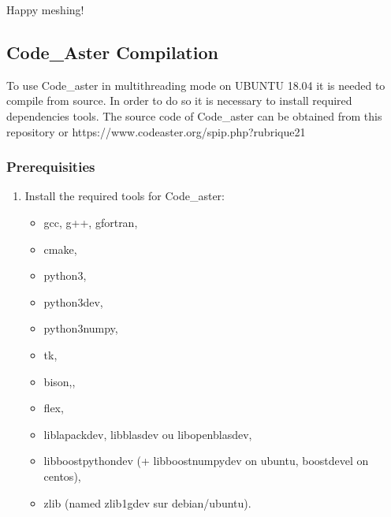\documentclass[letterpaper,10pt,english]{sphinxmanual}
\begin{document}
Happy meshing!


\subsection{Code\_Aster Compilation}
\label{\detokenize{software_setup/code_aster:code-aster-compilation}}\label{\detokenize{software_setup/code_aster::doc}}
To use Code\_aster in multithreading mode on UBUNTU 18.04 it is needed to compile from source. In order to do so it is necessary to install required dependencies tools. The source code of Code\_aster can be obtained from this repository or https://www.code\sphinxhyphen{}aster.org/spip.php?rubrique21


\subsubsection{Prerequisities}
\label{\detokenize{software_setup/code_aster:prerequisities}}\begin{enumerate}
%
\item {} 
Install the required tools for Code\_aster:
\begin{itemize}
\item {} 
gcc, g++, gfortran,

\item {} 
cmake,

\item {} 
python3,

\item {} 
python3\sphinxhyphen{}dev,

\item {} 
python3\sphinxhyphen{}numpy,

\item {} 
tk,

\item {} 
bison,,

\item {} 
flex,

\item {} 
liblapack\sphinxhyphen{}dev, libblas\sphinxhyphen{}dev ou libopenblas\sphinxhyphen{}dev,

\item {} 
libboost\sphinxhyphen{}python\sphinxhyphen{}dev (+ libboost\sphinxhyphen{}numpy\sphinxhyphen{}dev on ubuntu, boost\sphinxhyphen{}devel on centos),

\item {} 
zlib (named zlib1g\sphinxhyphen{}dev sur debian/ubuntu).

\end{itemize}

\end{enumerate}
\end{document}
